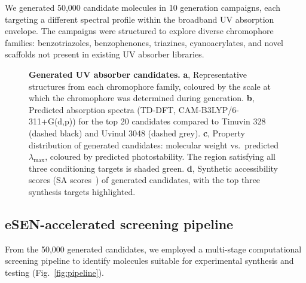 \documentclass[11pt]{article}
\begin{document}
We generated 50{,}000 candidate molecules in 10 generation campaigns, each targeting a different spectral profile within the broadband UV absorption envelope. The campaigns were structured to explore diverse chromophore families: benzotriazoles, benzophenones, triazines, cyanoacrylates, and novel scaffolds not present in existing UV absorber libraries.

\begin{figure}[t]
    \centering
    \caption{\textbf{Generated UV absorber candidates.} \textbf{a}, Representative structures from each chromophore family, coloured by the scale at which the chromophore was determined during generation. \textbf{b}, Predicted absorption spectra (TD-DFT, CAM-B3LYP/6-311+G(d,p)) for the top 20 candidates compared to Tinuvin 328 (dashed black) and Uvinul 3048 (dashed grey). \textbf{c}, Property distribution of generated candidates: molecular weight vs.\ predicted $\lambda_{\max}$, coloured by predicted photostability. The region satisfying all three conditioning targets is shaded green. \textbf{d}, Synthetic accessibility scores (SA scores~\cite{ertl2009sa}) of generated candidates, with the top three synthesis targets highlighted.}
    \label{fig:uv_candidates}
\end{figure}


\subsection*{eSEN-accelerated screening pipeline}

From the 50{,}000 generated candidates, we employed a multi-stage computational screening pipeline to identify molecules suitable for experimental synthesis and testing (Fig.~\ref{fig:pipeline}).
\end{document}
